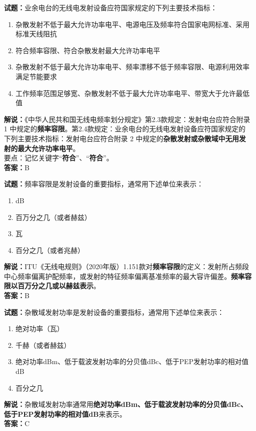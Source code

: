\documentclass{ctexbook}
\begin{document}
\bigskip


\noindent\textbf{试题：}业余电台的无线电发射设备应符国家规定的下列主要技术指标：
\begin{enumerate}[leftmargin=3em]
\item 杂散发射不低于最大允许功率电平、电源电压及频率符合国家电网标准、采用标准天线阻抗
\item 符合频率容限、符合杂散发射最大允许功率电平
\item 杂散发射不低于最大允许功率电平、频率漂移不低于频率容限、电源利用效率满足节能要求
\item 工作频率范围足够宽、杂散发射不低于最大允许功率电平、带宽大于允许最低值
\end{enumerate}
\noindent\textbf{解说：}《中华人民共和国无线电频率划分规定》第2.3款规定：发射电台应符合附录 1 中规定的\textbf{频率容限}。第2.4款规定：业余电台的无线电发射设备应符国家规定的下列主要技术指标：发射电台应符合附录 2 中规定的\textbf{杂散发射或杂散域中无用发射的最大允许功率电平}。\\要点：记忆关键字“\textbf{符合}”、“\textbf{符合}”。\\\noindent\textbf{答案：}B




\bigskip


\noindent\textbf{试题：}频率容限是发射设备的重要指标，通常用下述单位来表示：
\begin{enumerate}[leftmargin=3em]
\item dB
\item 百万分之几（或者赫兹）
\item 瓦
\item 百分之几（或者兆赫）
\end{enumerate}
\noindent\textbf{解说：}ITU《无线电规则》（2020年版）1.151款对\textbf{频率容限}的定义：发射所占频段中心频率偏离护配频率，或发射的特征频率偏离基准频率的最大容许偏差。\textbf{频率容限以百万分之几或以赫兹表示}。\\\noindent\textbf{答案：}B




\bigskip


\noindent\textbf{试题：}杂散域发射功率是发射设备的重要指标，通常用下述单位来表示：
\begin{enumerate}[leftmargin=3em]
\item 绝对功率（瓦）
\item 千赫（或者赫兹）%
\item 绝对功率dBm、低于载波发射功率的分贝值dBc、低于PEP发射功率的相对值dB
\item 百分之几
\end{enumerate}
\noindent\textbf{解说：}杂散域发射功率通常用\textbf{绝对功率dBm、低于载波发射功率的分贝值dBc、低于PEP发射功率的相对值dB}来表示。\\\noindent\textbf{答案：}C
\end{document}
